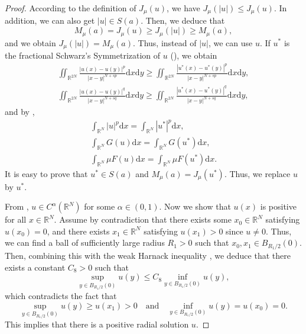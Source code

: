 \documentclass[reqno]{amsart}
\begin{document}
\begin{proof}
According to the definition of $J_\mu(u)$, we have $J_\mu(|u|)\le J_\mu(u)$.
In addition, we can also get $|u|\in S(a)$. Then, we deduce that
$$
M_\mu(a)=J_\mu(u)\ge J_\mu(|u|)\ge M_\mu(a),
$$
and we obtain $J_\mu(|u|)=M_\mu(a)$. Thus, instead of $|u|$, we can use $u$. 
If $u^{*}$ is the fractional Schwarz's Symmetrization of $u$ 
(\cite[Section 9.2]{ref5}), we obtain
\begin{gather*}
\iint_{\mathbb{R}^{2N}}\frac{|u(x)-u(y)|^{p}}{|x-y|^{N+sp}}
\mathrm{d}x\mathrm{d}y\ge \iint_{\mathbb{R}^{2N}}\frac{|u^{*}(x)
-u^{*}(y)|^{p}}{|x-y|^{N+sp}}\mathrm{d}x\mathrm{d}y,\\
\iint_{\mathbb{R}^{2N}}\frac{|u(x)-u(y)|^{q}}{|x-y|^{N+sq}}\mathrm{d}x\mathrm{d}y
\ge \iint_{\mathbb{R}^{2N}}\frac{|u^{*}(x)-u^{*}(y)|^{q}}{|x-y|^{N+sq}}
\mathrm{d}x\mathrm{d}y,
\end{gather*}
and by \cite[section 3.3]{ref22},
\begin{gather*}
\int_{\mathbb{R}^N} |u|^{p}\mathrm{d}x=\int_{\mathbb{R}^N} |u^{*}|^{p}\mathrm{d}x,\\
\int_{\mathbb{R}^N} G(u)\mathrm{d}x=\int_{\mathbb{R}^N} G(u^{*})\mathrm{d}x,\\
\int_{\mathbb{R}^N}\mu F(u)\mathrm{d}x=\int_{\mathbb{R}^N}\mu F(u^{*})\mathrm{d}x.
\end{gather*}
It is easy to prove that $u^{*}\in S(a)$ and $M_\mu(a)=J_\mu(u^{*})$. 
Thus, we replace $u$ by $u^{*}$.

From \cite{n4},  $u \in C^{\alpha}(\mathbb{R}^N)$ for some $\alpha\in (0,1)$. 
Now we show that $u(x)$ is positive for all $x\in\mathbb{R}^N$.
Assume by contradiction that there exists some $x_0\in\mathbb{R}^N$ satisfying 
$u(x_0)=0$, and there exists $x_1\in\mathbb{R}^N$ satisfying $u(x_1)>0$ since 
$u\neq 0$.
Thus, we can find a ball of sufficiently large radius
$R_1 > 0$ such that $x_0, x_1 \in B_{R_1/2}(0)$.
Then, combining this with the weak Harnack inequality \cite{n1}, we deduce that 
there exists a constant $C_8 > 0$ such that
$$
\sup_{y\in B_{R_1/2}(0)}  u(y)\le C_8\underset{y\in B_{R_1/2}(0)}\inf u(y),
$$
which contradicts the fact that
$$
\sup_{y\in B_{R_1/2}(0)}u(y)\ge u(x_1)>0\quad \text{and}\quad
\inf_{y\in B_{R_1/2}(0)}u(y)=u(x_0)=0.
$$
This implies that there is a positive radial solution $u$.


\end{proof}
\end{document}
